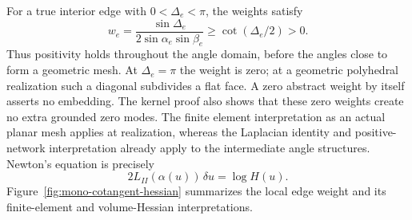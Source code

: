 For a true interior edge with $0<\Delta_e<\pi$, the weights satisfy
\begin{equation}
 w_e=\frac{\sin\Delta_e}{2\sin\alpha_e\sin\beta_e}
       \ge\cot(\Delta_e/2)>0.
 \label{eq:ipolyWeightLower}
\end{equation}
Thus positivity holds throughout the angle domain, before the angles
close to form a geometric mesh. At $\Delta_e=\pi$ the weight is zero;
at a geometric polyhedral realization such a diagonal subdivides a
flat face. A zero abstract weight by itself asserts no embedding.
The kernel proof also shows that these zero weights create no extra
grounded zero modes. The finite element interpretation
as an actual planar mesh applies at realization, whereas the Laplacian
identity and positive-network interpretation already apply to the
intermediate angle structures. Newton's equation is precisely
\begin{equation}
 2L_{II}(\alpha(u))\,\delta u=\log H(u).
 \label{eq:ipolyNewton}
\end{equation}
Figure~\ref{fig:mono-cotangent-hessian} summarizes the local edge weight
and its finite-element and volume-Hessian interpretations.

